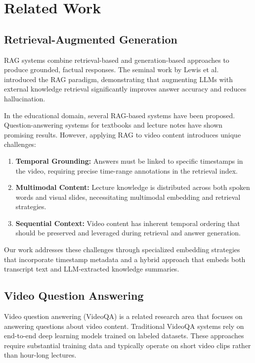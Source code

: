 \section{Related Work}
\label{sec:related-work}

\subsection{Retrieval-Augmented Generation}

RAG systems combine retrieval-based and generation-based approaches to produce grounded, factual responses. The seminal work by Lewis et al. \cite{lewis2020retrieval} introduced the RAG paradigm, demonstrating that augmenting LLMs with external knowledge retrieval significantly improves answer accuracy and reduces hallucination.

In the educational domain, several RAG-based systems have been proposed. Question-answering systems for textbooks \cite{lee2021textbook} and lecture notes \cite{wang2022lecture} have shown promising results. However, applying RAG to video content introduces unique challenges:

\begin{enumerate}
    \item \textbf{Temporal Grounding:} Answers must be linked to specific timestamps in the video, requiring precise time-range annotations in the retrieval index.
    \item \textbf{Multimodal Content:} Lecture knowledge is distributed across both spoken words and visual slides, necessitating multimodal embedding and retrieval strategies.
    \item \textbf{Sequential Context:} Video content has inherent temporal ordering that should be preserved and leveraged during retrieval and answer generation.
\end{enumerate}

Our work addresses these challenges through specialized embedding strategies that incorporate timestamp metadata and a hybrid approach that embeds both transcript text and LLM-extracted knowledge summaries.

\subsection{Video Question Answering}

Video question answering (VideoQA) is a related research area that focuses on answering questions about video content. Traditional VideoQA systems \cite{xu2017video} rely on end-to-end deep learning models trained on labeled datasets. These approaches require substantial training data and typically operate on short video clips rather than hour-long lectures.


